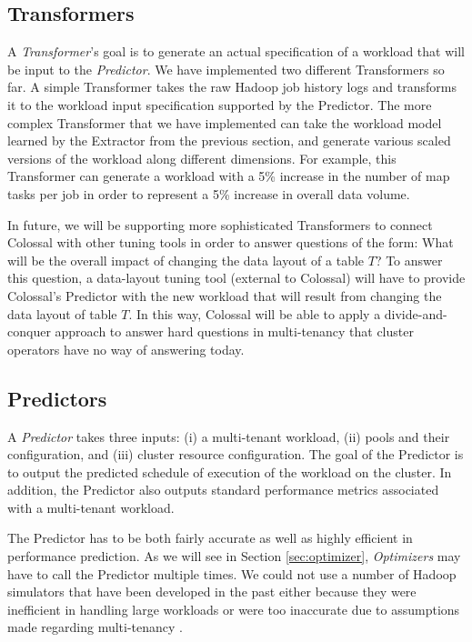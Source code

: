 \subsection{Transformers}
A {\em Transformer}'s goal is to generate an actual 
specification of a workload that will be input  
to the {\em Predictor}. We have implemented two different
Transformers so far. A simple Transformer takes the 
raw Hadoop job history logs and transforms it to the 
workload input specification supported by the Predictor. 
The more complex Transformer that we have implemented 
can take the workload model learned by the Extractor 
from the previous section, and generate various scaled versions
of the workload along different dimensions. For example, 
this Transformer can generate a workload 
with a 5\% increase in the number of map tasks per job
in order to represent a 5\% increase in overall
data volume. 

In future, we will be supporting more sophisticated
Transformers to connect Colossal with other tuning tools
in order to answer questions of the form: What will be the overall 
impact of changing the data layout of a table $T$? 
To answer this question, a data-layout tuning tool (external
to Colossal) will have to provide Colossal's Predictor with 
the new workload that will result from 
changing the data layout of table $T$. In this way, Colossal
will be able to apply a divide-and-conquer approach to 
answer hard questions in multi-tenancy that cluster operators 
have no way of answering today. 

\subsection{Predictors}
A {\em Predictor} takes three inputs: (i) a multi-tenant workload, 
(ii) pools and their configuration, and (iii) 
cluster resource configuration. The goal of the Predictor
is to output the predicted schedule of execution
of the workload on the cluster. In addition, the Predictor
also outputs standard performance metrics associated with 
a multi-tenant workload. 

The Predictor has to be both fairly accurate as well as 
highly efficient in performance prediction. As we will 
see in Section \ref{sec:optimizer}, {\em Optimizers} may have 
to call the Predictor multiple times. We could not 
use a number of Hadoop simulators that have 
been developed in the past either because they 
were inefficient in handling large workloads or 
were too inaccurate due to assumptions made 
regarding multi-tenancy \cite{sls,mr-sim}. 

